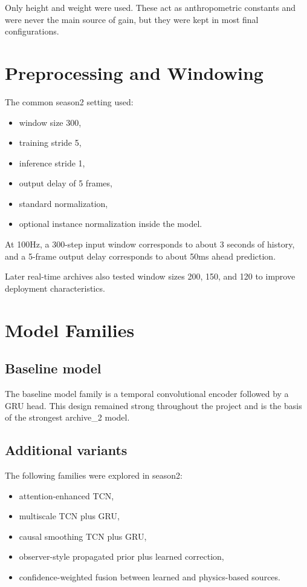 \documentclass[11pt,a4paper]{article}
\begin{document}
Only height and weight were used. These act as anthropometric constants and were never the main source of gain, but they were kept in most final configurations.

\section{Preprocessing and Windowing}

The common season2 setting used:

\begin{itemize}
\item window size 300,
\item training stride 5,
\item inference stride 1,
\item output delay of 5 frames,
\item standard normalization,
\item optional instance normalization inside the model.
\end{itemize}

At 100Hz, a 300-step input window corresponds to about 3 seconds of history, and a 5-frame output delay corresponds to about 50ms ahead prediction.

Later real-time archives also tested window sizes 200, 150, and 120 to improve deployment characteristics.

\section{Model Families}

\subsection{Baseline model}

The baseline model family is a temporal convolutional encoder followed by a GRU head. This design remained strong throughout the project and is the basis of the strongest archive\_2 model.

\subsection{Additional variants}

The following families were explored in season2:

\begin{itemize}
\item attention-enhanced TCN,
\item multiscale TCN plus GRU,
\item causal smoothing TCN plus GRU,
\item observer-style propagated prior plus learned correction,
\item confidence-weighted fusion between learned and physics-based sources.
\end{itemize}
\end{document}
